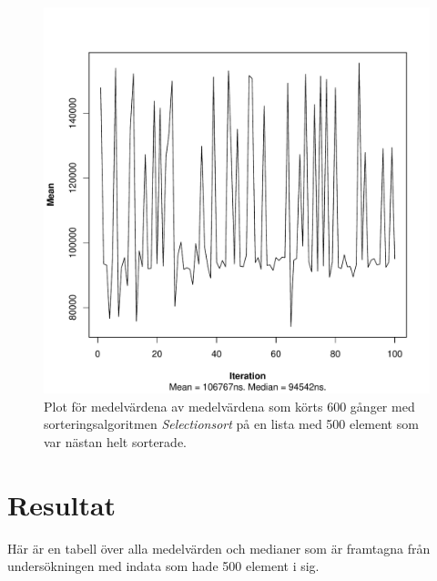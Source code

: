 \documentclass[a4paper]{article}
\begin{document}
\begin{figure}[H]
	\begin{center}
		\includegraphics[scale=0.4]{output/500/AlmostSorted/selectionSort_almost_sorted_500_600_100.pdf}
		\caption{Plot för medelvärdena av medelvärdena som körts 600 gånger med sorteringsalgoritmen \emph{Selectionsort} på en lista med 500 element som var nästan helt sorterade.}
	\end{center}
\end{figure}

\section{Resultat}
Här är en tabell över alla medelvärden och medianer som är framtagna från undersökningen med indata som hade 500 element i sig. 
\end{document}
